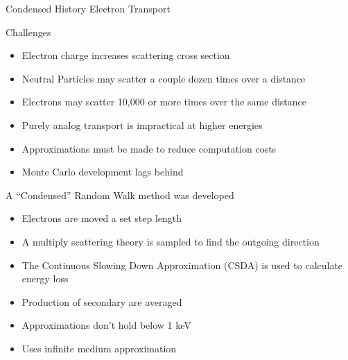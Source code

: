 \documentclass{beamer}
\begin{document}
  \begin{frame}{Condensed History Electron Transport}

  \begin{block}{Challenges}
    \begin{itemize}
      \item Electron charge increases scattering cross section
      \item Neutral Particles may scatter a couple dozen times over a distance
      \item Electrons may scatter 10,000 or more times over the same distance
      \item Purely analog transport is impractical at higher energies
      \item Approximations must be made to reduce computation costs
      \item Monte Carlo development lags behind
    \end{itemize}
  \end{block}
    
  \begin{block}{A “Condensed” Random Walk method was developed}
    \begin{itemize}
      \item Electrons are moved a set step length
      \item A multiply scattering theory is sampled to find the outgoing direction
      \item The Continuous Slowing Down Approximation (CSDA) is used to calculate energy loss
      \item Production of secondary are averaged
      \item Approximations don’t hold below 1 keV
      \item Uses infinite medium approximation
    \end{itemize}    
  \end{block}  

\end{frame}
\end{document}
